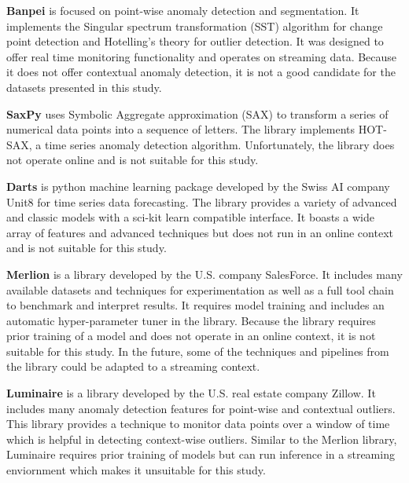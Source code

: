\textbf{Banpei} \parencite{banpei} is focused on point-wise anomaly detection and segmentation.
It implements the Singular spectrum transformation (SST) algorithm for change point detection and Hotelling's theory for outlier detection. It was designed to offer real time monitoring functionality and operates on streaming data. Because it does not offer contextual anomaly detection, it is not a good candidate for the datasets presented in this study.

\textbf{SaxPy} \parencite{senin2018grammarviz-saxpy} uses Symbolic Aggregate approximation (SAX) to transform a series of numerical data points into a sequence of letters. The library implements HOT-SAX, a time series anomaly detection algorithm. Unfortunately, the library does not operate online and is not suitable for this study.


\textbf{Darts} \parencite{herzen2021darts} is python machine learning package developed by the Swiss AI company Unit8 for time series data forecasting. The library provides a variety of advanced and classic models with a sci-kit learn compatible interface. It boasts a wide array of features and advanced techniques but does not run in an online context and is not suitable for this study.

\textbf{Merlion} \parencite{bhatnagar2021merlion} is a library developed by the U.S. company SalesForce. It includes many available datasets and techniques for experimentation as well as a full tool chain to benchmark and interpret results. It requires model training and includes an automatic hyper-parameter tuner in the library. Because the library requires prior training of a model and does not operate in an online context, it is not suitable for this study. In the future, some of the techniques and pipelines from the library could be adapted to a streaming context. 

\textbf{Luminaire} \parencite{chakraborty2020building-luminaire} is a library developed by the U.S. real estate company Zillow. It includes many anomaly detection features for point-wise and contextual outliers. This library provides a technique to monitor data points over a window of time which is helpful in detecting context-wise outliers. Similar to the Merlion library, Luminaire requires prior training of models but can run inference in a streaming enviornment which makes it unsuitable for this study.







